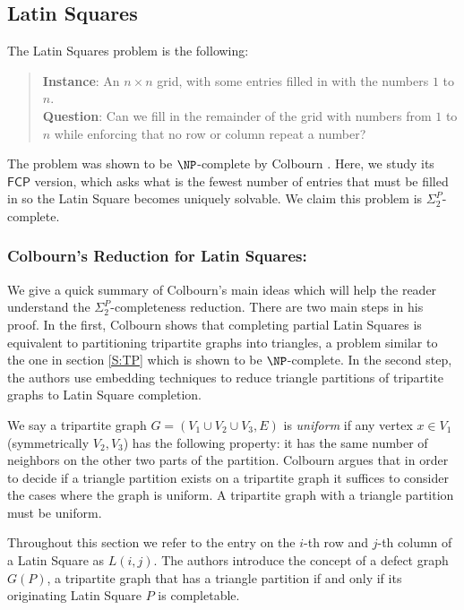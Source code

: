 \documentclass[runningheads,a4paper]{llncs}
\begin{document}
\subsection{Latin Squares}

The Latin Squares problem is the following:
\begin{quote}
\textbf{Instance}: An $n \times n$ grid, with some entries filled in with the numbers $1$ to $n$.\\
\textbf{Question}: Can we fill in the remainder of the grid with numbers from $1$ to $n$ while enforcing that no row or column repeat a number?
\end{quote}
The problem was shown to be $\NP$-complete by Colbourn \cite{colbourn1984complexity}. Here, we study its  $\mathsf{FCP}$ version, which asks what is the fewest number of entries that must be filled in so the Latin Square becomes uniquely solvable. We claim this problem is $\Sigma^P_2$-complete. 

\subsubsection{Colbourn's Reduction for Latin Squares:}
We give a quick summary of Colbourn's main ideas which will help the reader understand the $\Sigma^P_2$-completeness reduction. There are two main steps in his proof. In the first, Colbourn shows that completing partial Latin Squares is equivalent to partitioning tripartite graphs into triangles, a problem similar to the one in section \ref{S:TP} which is shown to be $\NP$-complete. In the second step, the authors use embedding techniques to reduce triangle partitions of tripartite graphs to Latin Square completion. 

We say a tripartite graph $G = (V_1 \cup V_2 \cup V_3, E)$ is \emph{uniform} if any vertex $x \in V_1$ (symmetrically $V_2, V_3$) has the following property: it has the same number of neighbors on the other two parts of the partition.  Colbourn \cite{colbourn1984complexity} argues that in order to decide if a triangle partition exists on a tripartite graph it suffices to consider the cases where the graph is uniform. A tripartite graph with a triangle partition must be uniform. 

Throughout this section we refer to the entry on the $i$-th row and $j$-th column of a Latin Square as $L(i,j)$. The authors introduce the concept of a defect graph $G(P)$, a tripartite graph that has a triangle partition if and only if its originating Latin Square $P$ is completable. 
\end{document}

